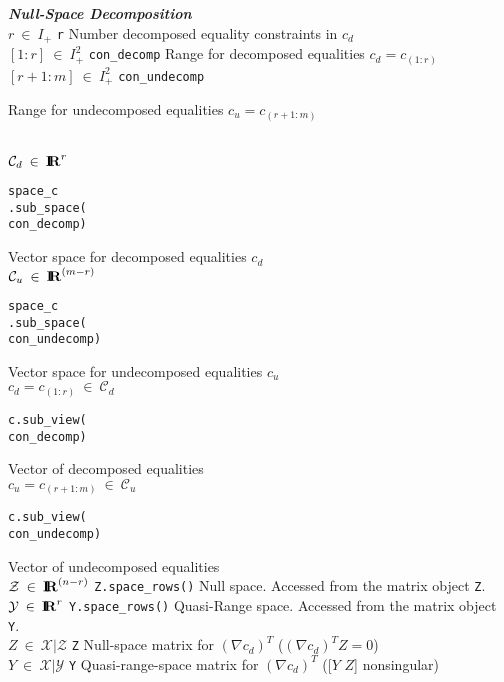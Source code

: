 {\begin{tabbing}
\textbf{\textit{Null-Space Decomposition}} \\
$r \:\in\:I_{+}$
	\> \texttt{r}
		\> Number decomposed equality constraints in $c_d$ \\
$[1:r] \:\in\:I_{+}^{2}$
	\> \texttt{con\_decomp}
		\> Range for decomposed equalities $c_d = c_{(1:r)}$ \\
$[r+1:m] \:\in\:I_{+}^{2}$
	\> \texttt{con\_undecomp}
		\> \parbox[t]{50ex}{Range for undecomposed equalities $c_u = c_{(r+1:m)}$ } \\
$\mathcal{C}_d \:\in\:\mbox{\textbf{I}}\hspace{-0.6ex}\mbox{\textbf{R}}^r$
	\>  \begin{minipage}[t]{16ex} \texttt{space\_c} \\ \texttt{.sub\_space(} \\ \texttt{con\_decomp)} \end{minipage}
		\> Vector space for decomposed equalities $c_d$ \\
$\mathcal{C}_u \:\in\:\mbox{\textbf{I}}\hspace{-0.6ex}\mbox{\textbf{R}}^{(m-r)}$
	\>  \begin{minipage}[t]{16ex} \texttt{space\_c} \\ \texttt{.sub\_space(} \\ \texttt{con\_undecomp)} \end{minipage}
		\> Vector space for undecomposed equalities $c_u$ \\
$c_d = c_{(1:r)} \:\in\: \mathcal{C}_d$
	\>  \begin{minipage}[t]{16ex} \texttt{c.sub\_view(} \\ \texttt{con\_decomp)} \end{minipage}
		\> Vector of decomposed equalities \\
$c_u = c_{(r+1:m)} \:\in\: \mathcal{C}_u$
	\>  \begin{minipage}[t]{16ex} \texttt{c.sub\_view(} \\ \texttt{con\_undecomp)} \end{minipage}
		\> Vector of undecomposed equalities \\
$\mathcal{Z} \:\in\: \mbox{\textbf{I}}\hspace{-0.6ex}\mbox{\textbf{R}}^{(n-r)}$
	\> \texttt{Z.space\_rows()}
		\> Null space.  Accessed from the matrix object \texttt{Z}. \\
$\mathcal{Y} \:\in\: \mbox{\textbf{I}}\hspace{-0.6ex}\mbox{\textbf{R}}^r$
	\> \texttt{Y.space\_rows()}
		\> Quasi-Range space.  Accessed from the matrix object \texttt{Y}. \\
$Z \:\in\: \mathcal{X}|\mathcal{Z}$
	\> \texttt{Z}
		\> Null-space matrix for $(\nabla c_d)^T$ ($(\nabla c_d)^T Z = 0$) \\
$Y \:\in\: \mathcal{X}|\mathcal{Y}$
	\> \texttt{Y}
		\> Quasi-range-space matrix for $(\nabla c_d)^T$ ([$Y$ $Z$] nonsingular) \\

\end{tabbing}}
